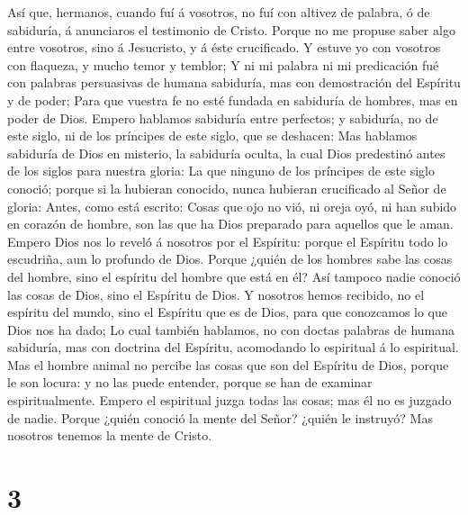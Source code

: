  Así que, hermanos, cuando fuí á vosotros, no fuí con
altivez de palabra, ó de sabiduría, á anunciaros el testimonio de
Cristo.  Porque no me propuse saber algo entre vosotros,
sino á Jesucristo, y á éste crucificado.  Y estuve yo con
vosotros con flaqueza, y mucho temor y temblor;  Y ni mi
palabra ni mi predicación fué con palabras persuasivas de humana
sabiduría, mas con demostración del Espíritu y de poder; 
Para que vuestra fe no esté fundada en sabiduría de hombres, mas en
poder de Dios.  Empero hablamos sabiduría entre perfectos; y
sabiduría, no de este siglo, ni de los príncipes de este siglo, que se
deshacen:  Mas hablamos sabiduría de Dios en misterio, la
sabiduría oculta, la cual Dios predestinó antes de los siglos para
nuestra gloria:  La que ninguno de los príncipes de este
siglo conoció; porque si la hubieran conocido, nunca hubieran
crucificado al Señor de gloria:  Antes, como está escrito:
Cosas que ojo no vió, ni oreja oyó, ni han subido en corazón de hombre,
son las que ha Dios preparado para aquellos que le aman. 
Empero Dios nos lo reveló á nosotros por el Espíritu: porque el Espíritu
todo lo escudriña, aun lo profundo de Dios.  Porque ¿quién
de los hombres sabe las cosas del hombre, sino el espíritu del hombre
que está en él? Así tampoco nadie conoció las cosas de Dios, sino el
Espíritu de Dios.  Y nosotros hemos recibido, no el
espíritu del mundo, sino el Espíritu que es de Dios, para que conozcamos
lo que Dios nos ha dado;  Lo cual también hablamos, no con
doctas palabras de humana sabiduría, mas con doctrina del Espíritu,
acomodando lo espiritual á lo espiritual.  Mas el hombre
animal no percibe las cosas que son del Espíritu de Dios, porque le son
locura: y no las puede entender, porque se han de examinar
espiritualmente.  Empero el espiritual juzga todas las
cosas; mas él no es juzgado de nadie.  Porque ¿quién
conoció la mente del Señor? ¿quién le instruyó? Mas nosotros tenemos la
mente de Cristo.

\hypertarget{section-2}{%
\section{3}\label{section-2}}

